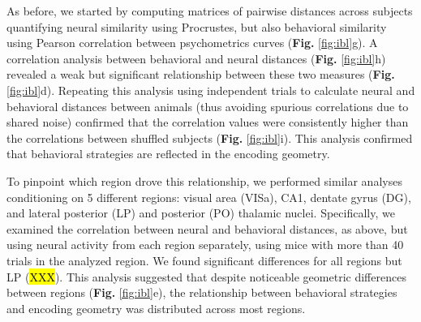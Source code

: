 As before, we started by computing matrices of pairwise distances across subjects quantifying neural similarity using Procrustes, but also behavioral similarity using Pearson correlation between psychometrics curves (\textbf{Fig. }\ref{fig:ibl}g). A correlation analysis between behavioral and neural distances (\textbf{Fig.} \ref{fig:ibl}h) revealed a weak but significant relationship between these two measures (\textbf{Fig.} \ref{fig:ibl}d). Repeating this analysis using independent trials to calculate neural and behavioral distances between animals (thus avoiding spurious correlations due to shared noise) confirmed that the correlation values were consistently higher than the correlations between shuffled subjects (\textbf{Fig.} \ref{fig:ibl}i). This analysis confirmed that behavioral strategies are reflected in the encoding geometry. 

To pinpoint which region drove this relationship, we performed similar analyses conditioning on 5 different regions: visual area (VISa), CA1, dentate gyrus (DG), and lateral posterior (LP) and posterior (PO) thalamic nuclei. Specifically, we examined the correlation between neural and behavioral distances, as above, but using neural activity from each region separately, using mice with more than 40 trials in the analyzed region. We found significant differences for all regions but LP (\hl{XXX}). This analysis suggested that despite noticeable geometric differences between regions (\textbf{Fig.} \ref{fig:ibl}e), the relationship between behavioral strategies and encoding geometry was distributed across most regions. 


